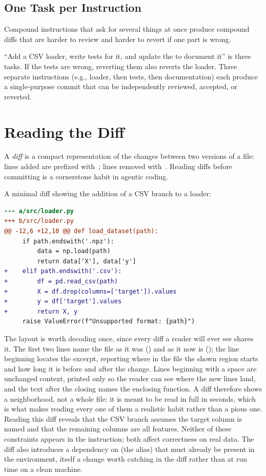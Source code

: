 \subsection{One Task per Instruction}

Compound instructions that ask for several things at once produce compound diffs that are harder to review and harder to revert if one part is wrong.

\begin{remark}
``Add a CSV loader, write tests for it, and update the  to document it'' is three tasks.
If the tests are wrong, reverting them also reverts the loader.
Three separate instructions (e.g., loader, then tests, then documentation) each produce a single-purpose commit that can be independently reviewed, accepted, or reverted.
\end{remark}

\section{Reading the Diff}
\label{section:ReadingDiff}

A \emph{diff} is a compact representation of the changes between two versions of a file: lines added are prefixed with~\code{+}; lines removed with~\code{-}.
Reading diffs before committing is a cornerstone habit in agentic coding.

\begin{example}
A minimal diff showing the addition of a CSV branch to a loader:
\begin{lstlisting}[language=diff]
--- a/src/loader.py
+++ b/src/loader.py
@@ -12,6 +12,10 @@ def load_dataset(path):
     if path.endswith('.npz'):
         data = np.load(path)
         return data['X'], data['y']
+    elif path.endswith('.csv'):
+        df = pd.read_csv(path)
+        X = df.drop(columns=['target']).values
+        y = df['target'].values
+        return X, y
     raise ValueError(f"Unsupported format: {path}")
\end{lstlisting}
The layout is worth decoding once, since every diff a reader will ever see shares it.
The first two lines name the file as it was () and as it now is ();
the line beginning  locates the excerpt, reporting where in the file the shown region starts and how long it is before and after the change.
Lines beginning with a space are unchanged context, printed only so the reader can see where the new lines land,
and the text after the closing  names the enclosing function.
A diff therefore shows a neighborhood, not a whole file: it is meant to be read in full in seconds, which is what makes reading every one of them a realistic habit rather than a pious one.
Reading this diff reveals that the CSV branch assumes the target column is named  and that the remaining columns are all features.
Neither of these constraints appears in the instruction; both affect correctness on real data.
The diff also introduces a dependency on  (the  alias) that must already be present in the environment, itself a change worth catching in the diff rather than at run time on a clean machine.
\end{example}

